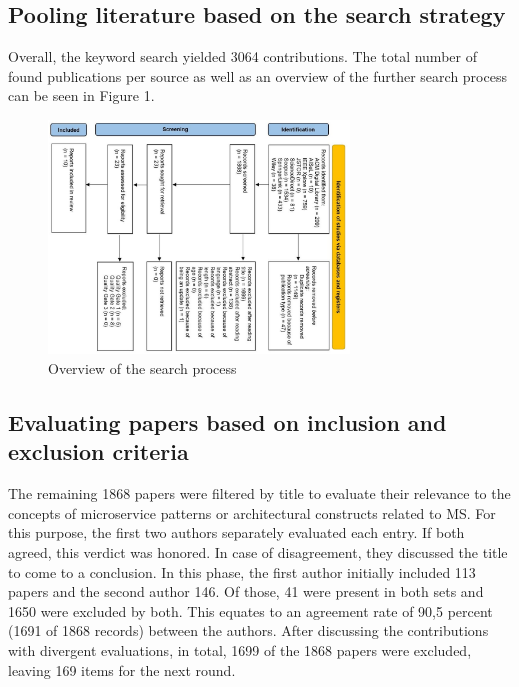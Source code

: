 \documentclass[a4paper,11pt,article,oneside]{memoir}
\begin{document}

\subsection{Pooling literature based on the search strategy}
Overall, the keyword search yielded 3064 contributions. The total number of found publications per source as well as an overview of the further search process can be seen in Figure 1.

\begin{figure}[h]
    \centering 
    \includegraphics[width=8cm]{Media/PRISMA-Flowchart.JPG}
    \caption{Overview of the search process}
    \label{fig:PRISMA}
\end{figure}

\subsection{Evaluating papers based on inclusion and exclusion criteria}

The remaining 1868 papers were filtered by title to evaluate their relevance to the concepts of microservice patterns or architectural constructs related to MS. For this purpose, the first two authors separately evaluated each entry. If both agreed, this verdict was honored. In case of disagreement, they discussed the title to come to a conclusion. In this phase, the first author initially included 113 papers and the second author 146. Of those, 41 were present in both sets and 1650 were excluded by both. This equates to an agreement rate of 90,5 percent (1691 of 1868 records) between the authors. After discussing the contributions with divergent evaluations, in total, 1699 of the 1868 papers were excluded, leaving 169 items for the next round. 
\end{document}
